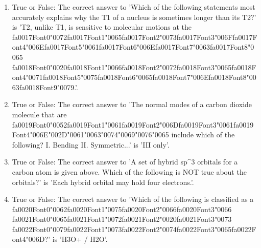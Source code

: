 \documentclass[12pt]{article}
\begin{document}
\begin{enumerate}[label=\arabic*.]
\item True or False: The correct answer to 'Which of the following statements most accurately explains why the T1 of a nucleus is sometimes longer than its T2?' is 'T2, unlike T1, is sensitive to molecular motions at the {\csname fa0017Font0\endcsname\char"0072}{\csname fa0017Font1\endcsname\char"0065}{\csname fa0017Font2\endcsname\char"0073}{\csname fa0017Font3\endcsname\char"006F}{\csname fa0017Font4\endcsname\char"006E}{\csname fa0017Font5\endcsname\char"0061}{\csname fa0017Font6\endcsname\char"006E}{\csname fa0017Font7\endcsname\char"0063}{\csname fa0017Font8\endcsname\char"0065} {\csname fa0018Font0\endcsname\char"0020}{\csname fa0018Font1\endcsname\char"0066}{\csname fa0018Font2\endcsname\char"0072}{\csname fa0018Font3\endcsname\char"0065}{\csname fa0018Font4\endcsname\char"0071}{\csname fa0018Font5\endcsname\char"0075}{\csname fa0018Font6\endcsname\char"0065}{\csname fa0018Font7\endcsname\char"006E}{\csname fa0018Font8\endcsname\char"0063}{\csname fa0018Font9\endcsname\char"0079}.'.
\item True or False: The correct answer to 'The normal modes of a carbon dioxide molecule that are {\csname fa0019Font0\endcsname\char"0052}{\csname fa0019Font1\endcsname\char"0061}{\csname fa0019Font2\endcsname\char"006D}{\csname fa0019Font3\endcsname\char"0061}{\csname fa0019Font4\endcsname\char"006E}{\char"002D}{\char"0061}{\char"0063}{\char"0074}{\char"0069}{\char"0076}{\char"0065} include which of the following? I. Bending II. Symmetric...' is 'III only'.
\item True or False: The correct answer to 'A set of hybrid sp\^{}3 orbitals for a carbon atom is given above. Which of the following is NOT true about the orbitals?' is 'Each hybrid orbital may hold four electrons.'.
\item True or False: The correct answer to 'Which of the following is classified as a {\csname fa0020Font0\endcsname\char"0062}{\csname fa0020Font1\endcsname\char"0075}{\csname fa0020Font2\endcsname\char"0066}{\csname fa0020Font3\endcsname\char"0066} {\csname fa0021Font0\endcsname\char"0065}{\csname fa0021Font1\endcsname\char"0072}{\csname fa0021Font2\endcsname\char"0020}{\csname fa0021Font3\endcsname\char"0073} {\csname fa0022Font0\endcsname\char"0079}{\csname fa0022Font1\endcsname\char"0073}{\csname fa0022Font2\endcsname\char"0074}{\csname fa0022Font3\endcsname\char"0065}{\csname fa0022Font4\endcsname\char"006D}?' is 'H3O+ / H2O'.

\end{enumerate}
\end{document}
